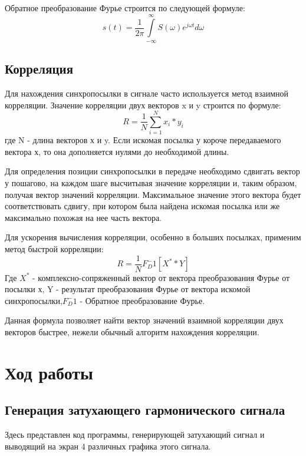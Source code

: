 Обратное преобразование Фурье строится по следующей формуле:
\begin{equation}
	s(t) = \frac{1}{2\pi} \int \limits_{-\infty}^{\infty} S(\omega)e^{j\omega t} d\omega
\end{equation}

\subsection{Корреляция}
Для нахождения синхропосылки в сигнале часто используется метод взаимной корреляции. Значение корреляции двух векторов x и y строится по формуле:
\begin{equation}
	R = \frac {1}{N} \sum \limits_{i=1}^{N} x_i * y_i
\end{equation}
где N - длина векторов х и y. Если искомая посылка у короче передаваемого вектора х, то она дополняется нулями до необходимой длины.

Для определения позиции синхропосылки в передаче необходимо сдвигать вектор у пошагово, на каждом шаге высчитывая значение корреляции и, таким образом, получая вектор значений корреляции. Максимальное значение этого вектора будет соответствовать сдвигу, при котором была найдена искомая посылка или же максимально похожая на нее часть вектора.

Для ускорения вычисления корреляции, особенно в больших посылках, применим метод быстрой корреляции:
\begin{equation}
	R = \frac{1}{N} F_D^-1 [X^* * Y]
\end{equation}
Где $X^*$ - комплексно-сопряженный вектор от вектора преобразования Фурье от посылки х, Y - результат преобразования Фурье от вектора искомой синхропосылки,$ F_D^-1$ - Обратное преобразование Фурье.

Данная формула позволяет найти вектор значений взаимной корреляции двух векторов быстрее, нежели обычный алгоритм нахождения корреляции.

\section{Ход работы}

\subsection{Генерация затухающего гармонического сигнала}


\parindent=1cm
Здесь представлен код программы, генерирующей затухающий сигнал и выводящий на экран 4 различных графика этого сигнала.

